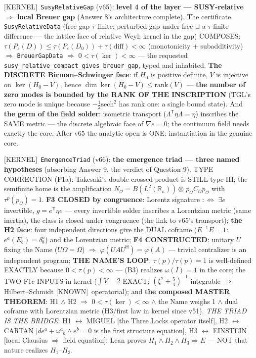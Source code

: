 \documentclass[11pt]{article}
\providecommand{\kernelmk}[1]{\textsf{[KERNEL]}~\texttt{#1}}\providecommand{\knownmk}[1]{\textsf{[KNOWN]}~{#1}}\providecommand{\statusmk}[1]{\textsf{[#1]}}
\theoremstyle{definition}\newtheorem{deriv}{Derivation}
\begin{document}
\kernelmk{SusyRelativeGap} (v65): \textbf{level 4 of the layer --- SUSY-relative $\Rightarrow$ local Breuer gap} (Answer 8's architecture complete). The certificate \texttt{SusyRelativeData} (free gap $\tau$-finite; perturbed gap under free $\sqcup$ a $\tau$-finite difference --- the lattice face of relative Weyl; kernel in the gap) COMPOSES: $\tau(P_\varepsilon(D))\le\tau(P_\varepsilon(D_0))+\tau(\mathrm{diff})<\infty$ (monotonicity $+$ subadditivity) $\Rightarrow$ \texttt{BreuerGapData} $\Rightarrow$ $0<\tau(\ker)<\infty$ --- the requested \texttt{susy\_relative\_compact\_gives\_breuer\_gap}, typed and inhabited. \textbf{The DISCRETE Birman--Schwinger face}: if $H_0$ is positive definite, $V$ is injective on $\ker(H_0-V)$, hence $\dim\ker(H_0-V)\le\mathrm{rank}(V)$ --- \textbf{the number of zero modes is bounded by the RANK OF THE INSCRIPTION} (TGL's zero mode is unique because $-\tfrac12\mathrm{sech}^2$ has rank one: a single bound state). And \textbf{the germ of the field solder}: isometric transport ($\Lambda^\mathsf{T}\eta\Lambda=\eta$) inscribes the SAME metric --- the discrete algebraic face of $\nabla e=0$; the continuum field needs exactly the core. After v65 the analytic open is ONE: instantiation in the genuine core.

\kernelmk{EmergenceTriad} (v66): \textbf{the emergence triad --- three named hypotheses} (absorbing Answer 9, the verdict of Question 9). TYPE CORRECTION (F1a): Takesaki's double crossed product is STILL type III; the semifinite home is the amplification $N_{\mathcal O}=B(L^2(\mathbb R_\kappa))\overline\otimes\,p_{\mathcal O}C_{\mathcal O}p_{\mathcal O}$ with $\tau^p(p_{\mathcal O})=1$. \textbf{F3 CLOSED by congruence}: Lorentz signature $:\Leftrightarrow$ $\exists e$ invertible, $g=e^\mathsf{T}\eta e$ --- every invertible solder inscribes a Lorentzian metric (same inertia), the class is closed under congruence (the link to v65's transport); \textbf{the H2 face}: four independent directions give the DUAL coframe ($E^{-1}E=1$: $e^a(E_b)=\delta^a_b$) and the Lorentzian metric; \textbf{F4 CONSTRUCTED}: unitary $U$ fixing the Name ($U\Omega=\Omega$) $\Rightarrow$ $\varphi(UAU^\mathsf{H})=\varphi(A)$ --- trivial centralizer is an independent program; \textbf{THE NAME'S LOOP}: $\tau(p)/\tau(p)=1$ is well-defined EXACTLY because $0<\tau(p)<\infty$ --- (B3) realizes $\omega(I)=1$ in the core; the TWO F1c INPUTS in kernel ($\int V=2$ EXACT; $(\xi^2+\tfrac54)^{-1}$ integrable $\Rightarrow$ Hilbert--Schmidt \knownmk{operatorial}); and \textbf{the composed MASTER THEOREM}: H1 $\wedge$ H2 $\Rightarrow$ $0<\tau(\ker)<\infty$ $\wedge$ the Name weighs 1 $\wedge$ dual coframe with Lorentzian metric (H3/first law in kernel since v51). \emph{THE TRIAD IS THE BRIDGE}: H1 $\leftrightarrow$ MIGUEL [the Three Locks operator itself], H2 $\leftrightarrow$ CARTAN [$de^a+\omega^a{}_b\wedge e^b=0$ is the first structure equation], H3 $\leftrightarrow$ EINSTEIN [local Clausius $\Rightarrow$ field equation]. Lean proves $H_1\wedge H_2\wedge H_3\Rightarrow E$ --- NOT that nature realizes $H_1$--$H_3$.
\end{document}
